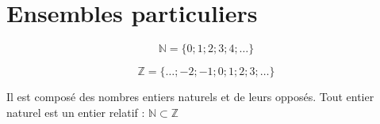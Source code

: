 \documentclass[main.tex]{subfiles}
\begin{document}
\newpage 
{}  
\pagestyle{scrheadings} %
\onehalfspacing
\section{Ensembles particuliers}

\begin{definition}
	\setlength{\abovedisplayskip}{3pt}
	\setlength{\belowdisplayskip}{3pt}
	$$\mathbb{N}=\{0;1;2;3;4;\dots\}$$ 
\end{definition}

\begin{definition}
	\setlength{\abovedisplayskip}{3pt}
	\setlength{\belowdisplayskip}{3pt}
	$$\mathbb{Z}=\{\dots;-2;-1;0;1;2;3;\dots\}$$
\end{definition} 
Il est composé des nombres entiers naturels et de leurs opposés.
Tout entier naturel est un entier relatif : $\mathbb{N}\subset \mathbb{Z}$ 
 
\end{document}

